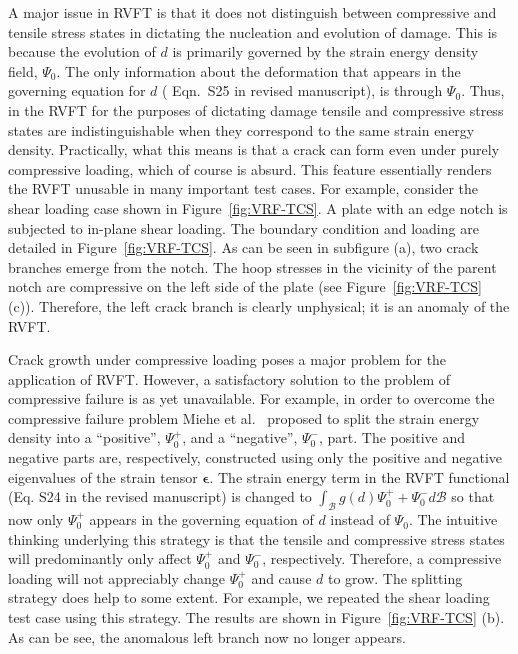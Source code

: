 \documentclass[11pt,letterpaper]{report}
\begin{document}
\begin{enumerate}[label=\textit{2.\arabic*},wide, labelwidth=!, labelindent=0pt]
A major issue in RVFT is that it does not distinguish between compressive and tensile stress states in dictating the nucleation and evolution of damage. This is because the evolution of $d$ is primarily governed by the strain energy density field, $\Psi_0$.  The only information about the deformation that appears in the governing equation for $d$ ( Eqn.~S25 in revised manuscript), is through $\Psi_0$. Thus, in the RVFT for the purposes of  dictating damage tensile and compressive stress states are indistinguishable when they correspond to the same strain energy density. Practically, what this means is that  a crack can form even under purely compressive loading, which of course is absurd. This feature essentially renders the RVFT unusable in many  important test cases. For example, consider the shear loading case shown in Figure~\ref{fig:VRF-TCS}.  A plate with an edge notch is subjected to in-plane shear loading. The boundary condition and loading are detailed in  Figure~\ref{fig:VRF-TCS}. As can be seen in subfigure (a), two crack branches emerge from the notch. The hoop stresses in the vicinity of the parent notch are compressive on the left side of the plate (see Figure~\ref{fig:VRF-TCS} (c)). Therefore, the left crack branch is clearly unphysical; it is an anomaly of the RVFT.


Crack growth under compressive loading poses a major problem for the application of RVFT.  However, a satisfactory solution to the problem of compressive failure is as yet unavailable.
%
For example, in order to overcome the compressive failure problem  Miehe et al.~\cite{miehe2010phase} proposed to split the strain energy density into a ``positive'', $\Psi_0^+$, and a ``negative'', $\Psi_0^-$, part.
%
The positive and negative parts are, respectively, constructed  using only the positive and negative eigenvalues of the strain tensor $\boldsymbol{\epsilon}$.
%
The strain energy term in the RVFT functional (Eq. S24 in the revised manuscript) is changed to $\int_{\mathcal{B}}g(d)\Psi_0^+ + \Psi_0^-d\mathcal{B}$ so  that now only $\Psi^+_0$ appears in the governing equation of $d$ instead of $\Psi_0$.
The intuitive thinking underlying   this strategy is that  the tensile and compressive stress states will predominantly only affect  $\Psi_0^+$ and $\Psi_0^-$, respectively.
%
Therefore, a compressive loading will not appreciably change $\Psi^+_0$ and cause $d$ to grow.
%
The splitting strategy does help to some extent.
%
For example, we repeated the shear loading test case using this strategy.
%
The results are shown in  Figure~\ref{fig:VRF-TCS} (b).
%
As can be see,  the anomalous left branch now no longer appears.


\end{enumerate}
\end{document}
